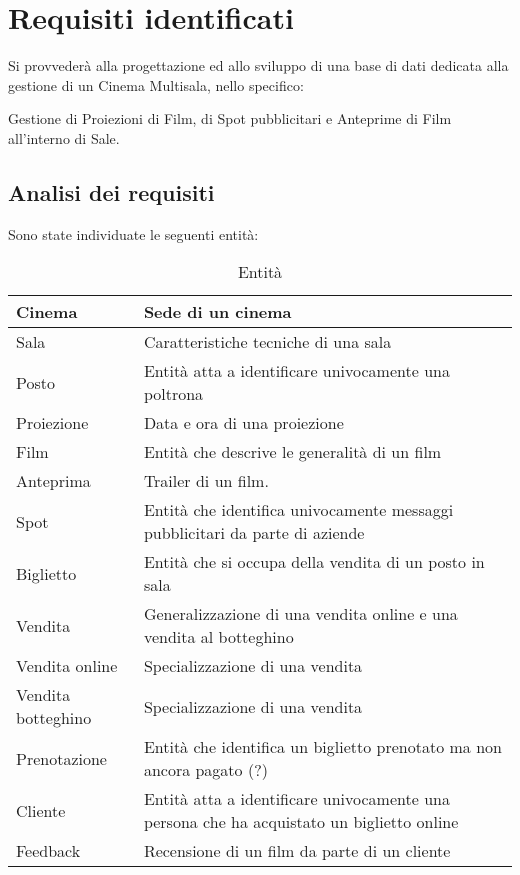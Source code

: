 \chapter{Requisiti identificati}
    Si provvederà alla progettazione ed allo sviluppo di una base di dati dedicata alla gestione di un Cinema Multisala, nello specifico:
    
        Gestione di Proiezioni di Film, di Spot pubblicitari e Anteprime di Film all'interno di Sale.
    \newpage
    \section{Analisi dei requisiti}
    
    Sono state individuate le seguenti entità:
    
    
    \begin{table}[!h]
        \begin{tabular}{|l | p{}|}
        \hline
            Cinema &  Sede di un cinema \\
            \hline
            Sala &  Caratteristiche tecniche di una sala \\
            \hline
            Posto & Entità atta a identificare univocamente una poltrona\\
            \hline
            Proiezione & Data e ora di una proiezione \\
            \hline
            Film & Entità che descrive le generalità di un film \\ 
            \hline
            Anteprima & Trailer di un film. \\
            \hline
            Spot & Entità che identifica univocamente messaggi pubblicitari
            da parte di aziende \\
            \hline
             Biglietto & Entità che si occupa della vendita di un posto in sala \\ 
            \hline
            Vendita & Generalizzazione di una vendita online e una vendita al botteghino \\
            \hline
            Vendita online & Specializzazione di una vendita \\
            \hline
            Vendita botteghino & Specializzazione di una vendita \\
            \hline
            Prenotazione & Entità che identifica un biglietto prenotato ma non ancora pagato (?) \\
            \hline
            Cliente & Entità atta a identificare univocamente una persona che ha acquistato un biglietto online \\
            \hline
            Feedback & Recensione di un film da parte di un cliente \\ 
            \hline
        \end{tabular}
        \caption{Entità}
        \label{entita}
    \end{table}
    
